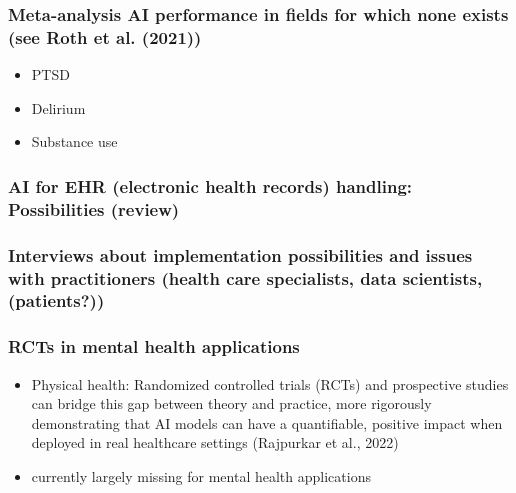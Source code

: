 \documentclass[
  man]{apa7}
\providecommand{\tightlist}{%
  \setlength{\itemsep}{0pt}\setlength{\parskip}{0pt}}
\begin{document}
\hypertarget{meta-analysis-ai-performance-in-fields-for-which-none-exists-see-roth_etal21}{%
\subsubsection{Meta-analysis AI performance in fields for which none exists (see Roth et al. (2021))}\label{meta-analysis-ai-performance-in-fields-for-which-none-exists-see-roth_etal21}}

\begin{itemize}
\tightlist
\item
  PTSD
\item
  Delirium
\item
  Substance use
\end{itemize}

\hypertarget{ai-for-ehr-electronic-health-records-handling-possibilities-review}{%
\subsubsection{AI for EHR (electronic health records) handling: Possibilities (review)}\label{ai-for-ehr-electronic-health-records-handling-possibilities-review}}

\hypertarget{interviews-about-implementation-possibilities-and-issues-with-practitioners-health-care-specialists-data-scientists-patients}{%
\subsubsection{Interviews about implementation possibilities and issues with practitioners (health care specialists, data scientists, (patients?))}\label{interviews-about-implementation-possibilities-and-issues-with-practitioners-health-care-specialists-data-scientists-patients}}

\hypertarget{rcts-in-mental-health-applications}{%
\subsubsection{RCTs in mental health applications}\label{rcts-in-mental-health-applications}}

\begin{itemize}
\tightlist
\item
  Physical health: Randomized controlled trials (RCTs) and prospective studies can bridge this gap between theory and practice, more
  rigorously demonstrating that AI models can have a quantifiable, positive impact when deployed in real healthcare settings (Rajpurkar et al., 2022)
\item
  currently largely missing for mental health applications
\end{itemize}
\end{document}
